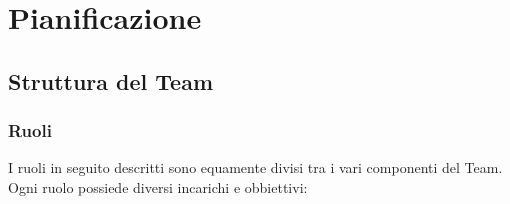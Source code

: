 \documentclass{article}
\begin{document}



\newpage
\section{Pianificazione}
    \subsection{Struttura del Team}
        \subsubsection{Ruoli}
        I ruoli in seguito descritti sono equamente divisi tra i vari componenti del Team. Ogni ruolo possiede diversi incarichi e obbiettivi:
\end{document}
